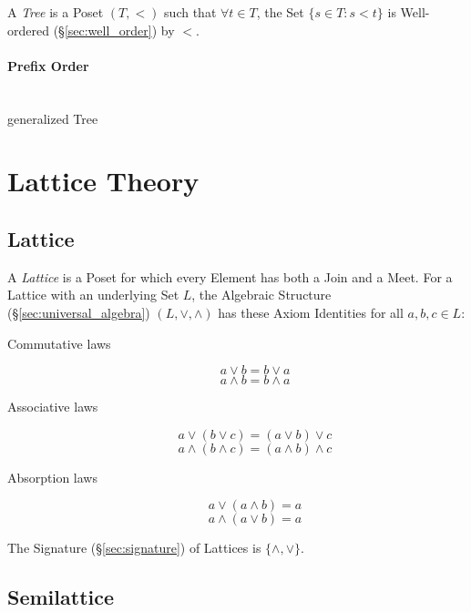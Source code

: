 A \emph{Tree} is a Poset $(T,<)$ such that $\forall t \in T$, the Set
$\{s \in T : s < t \}$ is Well-ordered (\S\ref{sec:well_order}) by
$<$.



\paragraph{Prefix Order}\label{sec:prefix_order}
\hfill \\

generalized Tree



\section{Lattice Theory}\label{sec:lattice_theory}

\subsection{Lattice}\label{sec:lattice}

A \emph{Lattice} is a Poset for which every Element has both a Join
and a Meet. For a Lattice with an underlying Set $L$, the Algebraic
Structure (\S\ref{sec:universal_algebra}) $(L, \vee, \wedge)$ has
these Axiom Identities for all $a,b,c \in L$:
\begin{description}
\item[Commutative laws]
\[
    a \vee b = b \vee a
\] \[
    a \wedge b = b \wedge a
\]
\item[Associative laws]
\[
    a \vee (b \vee c) = (a \vee b) \vee c
\] \[
    a \wedge (b \wedge c) = (a \wedge b) \wedge c
\]
\item[Absorption laws]
\[
    a \vee (a \wedge b) = a
\] \[
    a \wedge (a \vee b) = a
\]
\end{description}
The Signature (\S\ref{sec:signature}) of Lattices is
$\{\wedge, \vee\}$.



\subsection{Semilattice}\label{sec:semilattice}

